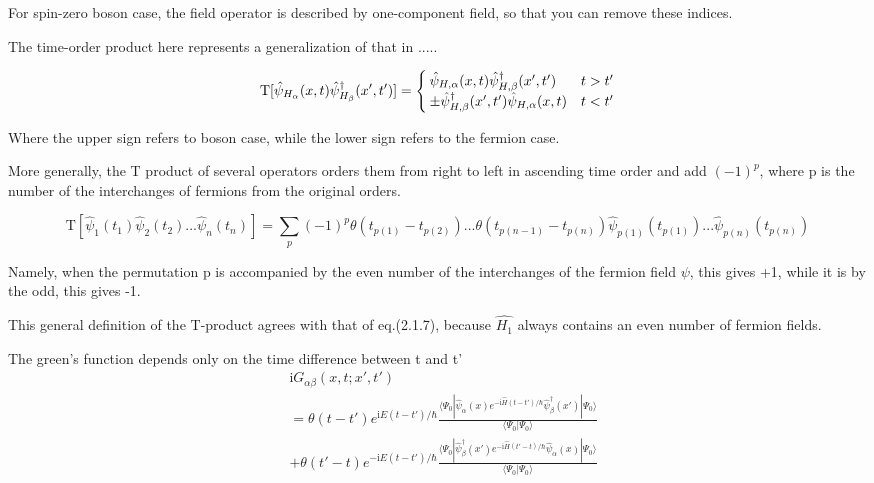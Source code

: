 For spin-zero boson case, the field operator is described by one-component field, so that you can remove these indices.

The time-order product here represents a generalization of that in .....

\begin{equation}
\mathrm{T}[\hat \psi_{H_{\alpha}}(x,t)\hat \psi^{\dagger}_{H_{\beta}}(x',t')]=\begin{cases}
\hat \psi_{H,\alpha}(x,t)\hat \psi^{\dagger}_{H,\beta}(x',t') &t>t' \cr  \pm \hat \psi^{\dagger}_{H,\beta}(x',t')\hat \psi_{H,\alpha}(x,t) &t<t'
\end{cases}\nonumber
\end{equation}

Where the upper sign refers to boson case, while the lower sign refers to the fermion case.

More generally, the T product of several operators orders them from right to left in ascending time order and add $(-1)^p$, where p is the number of the interchanges of fermions from the original orders.

\begin{equation}\label{2.3.2}
\mathrm{T}[\hat \psi_1(t_1)\hat \psi_2(t_2)...\hat \psi_n(t_n)]=\sum_{p}(-1)^p\theta(t_{p(1)}-t_{p(2)})...\theta(t_{p(n-1)}-t_{p(n)})\hat \psi_{p(1)}(t_{p(1)})...\hat \psi_{p(n)}(t_{p(n)}) 
\end{equation}

Namely, when the permutation p is accompanied by the even number of the interchanges of the fermion field $\psi$, this gives +1, while it is by the odd, this gives -1.

This general definition of the T-product agrees with that of eq.(2.1.7), because $\hat{H_1}$ always contains an even number of fermion fields.

The green's function depends only on the time difference between t and t'
\begin{align}
&\mathrm{i}G_{\alpha\beta}(x,t;x',t') \nonumber \\
&=\theta(t-t')e^{\mathrm{i}E(t-t')/\hbar}\frac{\langle\Psi_0|\hat \psi_{\alpha}(x)e^{-\mathrm{i}\hat{H}(t-t')/\hbar}\hat \psi^{
\dagger}_{\beta}(x')|\Psi_0\rangle}{\langle\Psi_0|\Psi_0\rangle} \nonumber \\
&+\theta(t'-t)e^{-\mathrm{i}E(t-t')/\hbar}\frac{\langle\Psi_0|\hat \psi^{
\dagger}_{\beta}(x')e^{-\mathrm{i}\hat{H}(t'-t)/\hbar}\hat \psi_{\alpha}(x)|\Psi_0\rangle}{\langle\Psi_0|\Psi_0\rangle} \nonumber
\end{align}

